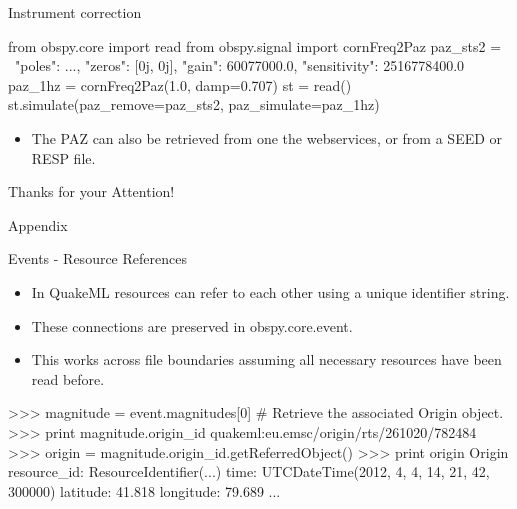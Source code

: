 \begin{frame}{Instrument correction}

\begin{myColorBox}{0.95}{}
\begin{python}
from obspy.core import read
from obspy.signal import cornFreq2Paz
paz_sts2 = {\
    "poles": ...,
    "zeros": [0j, 0j],
    "gain": 60077000.0,
    "sensitivity": 2516778400.0}
paz_1hz = cornFreq2Paz(1.0, damp=0.707)
st = read()
st.simulate(paz_remove=paz_sts2, paz_simulate=paz_1hz)
\end{python}
\end{myColorBox}

\begin{itemize}
    \item The PAZ can also be retrieved from one the webservices, or from a SEED or RESP file.
\end{itemize}

\end{frame}


\begin{frame}[plain, fragile]{}
    \begin{center}
        \textcolor{lmu@darkgreen}{\LARGE{Thanks for your Attention!}}
    \end{center}
\end{frame}


\begin{frame}{}
    \begin{center}
        \textcolor{lmu@darkgreen}{\LARGE{Appendix}}
    \end{center}
\end{frame}

\begin{frame}{Events - Resource References}
    \begin{itemize}
        \item In QuakeML resources can refer to each other using a unique identifier string.
        \item These connections are preserved in obspy.core.event.
        \item This works across file boundaries assuming all necessary resources have been read before.
    \end{itemize}
\begin{myColorBox}{0.95}{}
\begin{python}
>>> magnitude = event.magnitudes[0]
# Retrieve the associated Origin object.
>>> print magnitude.origin_id
quakeml:eu.emsc/origin/rts/261020/782484
>>> origin = magnitude.origin_id.getReferredObject()
>>> print origin
Origin
  resource_id: ResourceIdentifier(...)
         time: UTCDateTime(2012, 4, 4, 14, 21, 42, 300000)
     latitude: 41.818
    longitude: 79.689
    ...
\end{python}
\end{myColorBox}
\end{frame}




